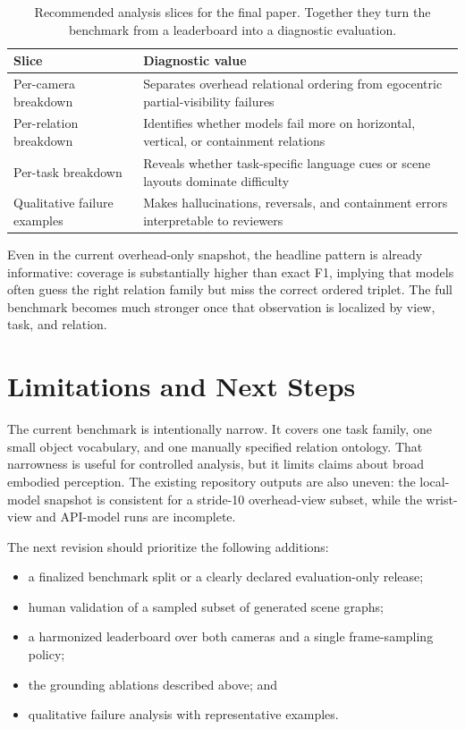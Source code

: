 \documentclass{article}
\begin{document}
\begin{table}[t]
    \caption{Recommended analysis slices for the final paper. Together they turn the benchmark from a leaderboard into a diagnostic evaluation.}
    \label{tab:analysis-slices}
    \centering
    \begin{tabularx}{\linewidth}{lX}
        \toprule
        Slice & Diagnostic value \\
        \midrule
        Per-camera breakdown & Separates overhead relational ordering from egocentric partial-visibility failures \\
        Per-relation breakdown & Identifies whether models fail more on horizontal, vertical, or containment relations \\
        Per-task breakdown & Reveals whether task-specific language cues or scene layouts dominate difficulty \\
        Qualitative failure examples & Makes hallucinations, reversals, and containment errors interpretable to reviewers \\
        \bottomrule
    \end{tabularx}
\end{table}

Even in the current overhead-only snapshot, the headline pattern is already informative: coverage is substantially higher than exact F1, implying that models often guess the right relation family but miss the correct ordered triplet. The full benchmark becomes much stronger once that observation is localized by view, task, and relation.

\section{Limitations and Next Steps}
The current benchmark is intentionally narrow. It covers one task family, one small object vocabulary, and one manually specified relation ontology. That narrowness is useful for controlled analysis, but it limits claims about broad embodied perception. The existing repository outputs are also uneven: the local-model snapshot is consistent for a stride-10 overhead-view subset, while the wrist-view and API-model runs are incomplete.

The next revision should prioritize the following additions:
\begin{itemize}
    \item a finalized benchmark split or a clearly declared evaluation-only release;
    \item human validation of a sampled subset of generated scene graphs;
    \item a harmonized leaderboard over both cameras and a single frame-sampling policy;
    \item the grounding ablations described above; and
    \item qualitative failure analysis with representative examples.
\end{itemize}
\end{document}
